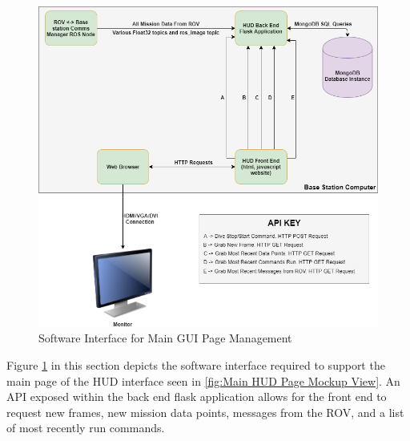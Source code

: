 \documentclass{scrreprt}
\begin{document}
\begin{figure}[!ht]
    \centering
    \includegraphics[scale=0.50]{HUDGUIManager.png}
    \caption{Software Interface for Main GUI Page Management}
    \label{fig:Software Interface for Main GUI Page Management}
\end{figure}
\FloatBarrier

Figure \ref{fig:Software Interface for Main GUI Page Management} in this section depicts the software interface required to support the main page of the HUD interface seen in \ref{fig:Main HUD Page Mockup View}. An API exposed within the back end flask application allows for the front end to request new frames, new mission data points, messages from the ROV, and a list of most recently run commands.  
\end{document}
